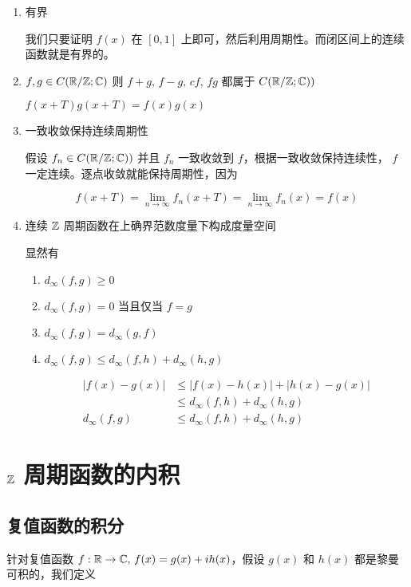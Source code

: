 \begin{enumerate}
    \item 有界

    我们只要证明 $f(x)$ 在 $[0,1]$ 上即可，然后利用周期性。而闭区间上的连续函数就是有界的。

    \item $f,g \in C(\mathbb{R} / \mathbb{Z}; \mathbb{C})$ 则 $f+g,\, f-g,\, cf,\, fg$ 都属于 $C(\mathbb{R} / \mathbb{Z}; \mathbb{C}))$

    $f(x+T)g(x+T) = f(x)g(x)$

    \item 一致收敛保持连续周期性

    假设 $f_n \in C(\mathbb{R} / \mathbb{Z}; \mathbb{C}))$ 并且 $f_n$ 一致收敛到 $f$，根据一致收敛保持连续性， $f$ 一定连续。逐点收敛就能保持周期性，因为

    \[
        f(x+T) = \lim_{n \to \infty}f_n(x+T) = \lim_{n \to \infty}f_n(x) = f(x)
    \]

    \item 连续 $\mathbb{Z}$ 周期函数在上确界范数度量下构成度量空间

    显然有
    \begin{enumerate}
        \item $d_\infty(f, g) \ge 0$
        \item $d_\infty(f,g) = 0$ 当且仅当 $f=g$
        \item $d_\infty(f,g) = d_\infty(g,f)$
        \item $d_\infty(f,g) \le d_\infty(f,h) + d_\infty(h,g)$

        \begin{align*}
        \lvert f(x) - g(x)\rvert & \le \lvert f(x) - h(x)\rvert + \lvert h(x) - g(x)\rvert \\
            & \le d_\infty(f,h) + d_\infty(h, g) \\
        d_\infty(f,g) & \le d_\infty(f,h) + d_\infty(h, g)
        \end{align*}
    \end{enumerate}

\end{enumerate}

\section{$\mathbb{Z}$ 周期函数的内积}

\subsection{复值函数的积分}

针对复值函数 $f: \mathbb{R} \to \mathbb{C},\, f(x) = g(x) + ih(x)$，假设 $g(x)$ 和 $h(x)$ 都是黎曼可积的，我们定义 

